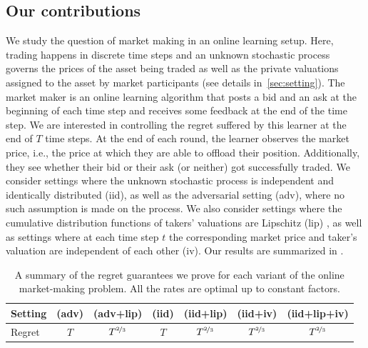 \documentclass[final,12pt]{colt2025}
\begin{document}
\subsection{Our contributions}
We study the question of market making in an online learning setup.
Here, trading happens in discrete time steps and an unknown stochastic process governs the prices of the asset being traded as well as the private valuations assigned to the asset by market participants (see details in~\cref{sec:setting}).
The market maker is an online learning algorithm that posts a bid and an ask at the beginning of each time step and receives some feedback at the end of the time step. 
We are interested in controlling the regret suffered by this learner at the end of $T$ time steps.
At the end of each round, the learner observes the market price, i.e., the price at which they are able to offload their position. Additionally, they see whether their bid or their ask (or neither) got successfully traded.
We consider settings where the unknown stochastic process is independent and identically distributed (iid), as well as the adversarial setting (adv), where no such assumption is made on the process. We also consider settings where the cumulative distribution functions of takers' valuations are Lipschitz (lip)%
, as well as settings where at each time step $t$ the corresponding market price and taker's valuation are independent of each other (iv).
Our results are summarized in .
\begin{table}
    \centering
    \begin{tabular}{l|c c|c c c c}
        \toprule
        Setting &  (adv) &  (adv+lip) &  (iid) &  (iid+lip) &  (iid+iv) & (iid+lip+iv) \\
        \midrule
        Regret & $T$ & $T^{\nicefrac{2}{3}}$ & $T$ &  $T^{\nicefrac{2}{3}}$ & $T^{\nicefrac{2}{3}}$ & $T^{\nicefrac{2}{3}}$ \\

        \bottomrule
    \end{tabular}
    \caption{A summary of the regret guarantees we prove for each variant of the online market-making problem. All the rates are optimal up to constant factors.\label{tab:our-results}}
\end{table}
\end{document}
